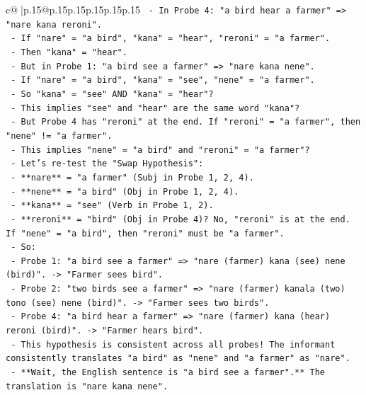 \documentclass{article}
\begin{document}
{\begin{supertabular}{c@{$\;$}|p{.15\linewidth}@{}p{.15\linewidth}p{.15\linewidth}p{.15\linewidth}p{.15\linewidth}p{.15\linewidth}}
{{{\texttt{    {-} In Probe 4: "a bird hear a farmer" => "nare kana reroni".} \\
\texttt{      {-} If "nare" = "a bird", "kana" = "hear", "reroni" = "a farmer".} \\
\texttt{      {-} Then "kana" = "hear".} \\
\texttt{      {-} But in Probe 1: "a bird see a farmer" => "nare kana nene".} \\
\texttt{      {-} If "nare" = "a bird", "kana" = "see", "nene" = "a farmer".} \\
\texttt{      {-} So "kana" = "see" AND "kana" = "hear"?} \\
\texttt{      {-} This implies "see" and "hear" are the same word "kana"?} \\
\texttt{      {-} But Probe 4 has "reroni" at the end. If "reroni" = "a farmer", then "nene" != "a farmer".} \\
\texttt{      {-} This implies "nene" = "a bird" and "reroni" = "a farmer"?} \\
\texttt{      {-} Let's re{-}test the "Swap Hypothesis":} \\
\texttt{        {-} **nare** = "a farmer" (Subj in Probe 1, 2, 4).} \\
\texttt{        {-} **nene** = "a bird" (Obj in Probe 1, 2, 4).} \\
\texttt{        {-} **kana** = "see" (Verb in Probe 1, 2).} \\
\texttt{        {-} **reroni** = "bird" (Obj in Probe 4)? No, "reroni" is at the end. If "nene" = "a bird", then "reroni" must be "a farmer".} \\
\texttt{        {-} So:} \\
\texttt{          {-} Probe 1: "a bird see a farmer" => "nare (farmer) kana (see) nene (bird)". {-}> "Farmer sees bird".} \\
\texttt{          {-} Probe 2: "two birds see a farmer" => "nare (farmer) kanala (two) tono (see) nene (bird)". {-}> "Farmer sees two birds".} \\
\texttt{          {-} Probe 4: "a bird hear a farmer" => "nare (farmer) kana (hear) reroni (bird)". {-}> "Farmer hears bird".} \\
\texttt{        {-} This hypothesis is consistent across all probes! The informant consistently translates "a bird" as "nene" and "a farmer" as "nare".} \\
\texttt{        {-} **Wait, the English sentence is "a bird see a farmer".** The translation is "nare kana nene".} \\
}}}
\end{supertabular}}
\end{document}
